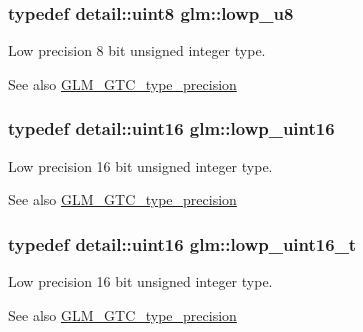 \subsubsection[{lowp\+\_\+u8}]{\setlength{\rightskip}{0pt plus 5cm}typedef {\bf detail\+::uint8} {\bf glm\+::lowp\+\_\+u8}}\label{group__gtc__type__precision_gae63f942c49a30dbf266b2f13f3efe257}
Low precision 8 bit unsigned integer type. \begin{DoxySeeAlso}{See also}
\hyperlink{group__gtc__type__precision}{G\+L\+M\+\_\+\+G\+T\+C\+\_\+type\+\_\+precision} 
\end{DoxySeeAlso}
\hypertarget{group__gtc__type__precision_ga9b8409887319f62f06e664f6ca121b9d}{}
\subsubsection[{lowp\+\_\+uint16}]{\setlength{\rightskip}{0pt plus 5cm}typedef {\bf detail\+::uint16} {\bf glm\+::lowp\+\_\+uint16}}\label{group__gtc__type__precision_ga9b8409887319f62f06e664f6ca121b9d}
Low precision 16 bit unsigned integer type. \begin{DoxySeeAlso}{See also}
\hyperlink{group__gtc__type__precision}{G\+L\+M\+\_\+\+G\+T\+C\+\_\+type\+\_\+precision} 
\end{DoxySeeAlso}
\hypertarget{group__gtc__type__precision_ga9a71176a4e5bc61951f9e9197d9c80e1}{}
\subsubsection[{lowp\+\_\+uint16\+\_\+t}]{\setlength{\rightskip}{0pt plus 5cm}typedef {\bf detail\+::uint16} {\bf glm\+::lowp\+\_\+uint16\+\_\+t}}\label{group__gtc__type__precision_ga9a71176a4e5bc61951f9e9197d9c80e1}
Low precision 16 bit unsigned integer type. \begin{DoxySeeAlso}{See also}
\hyperlink{group__gtc__type__precision}{G\+L\+M\+\_\+\+G\+T\+C\+\_\+type\+\_\+precision} 
\end{DoxySeeAlso}
\hypertarget{group__gtc__type__precision_gaf11e85af414720b4cd12bd57b3a81e68}{}
